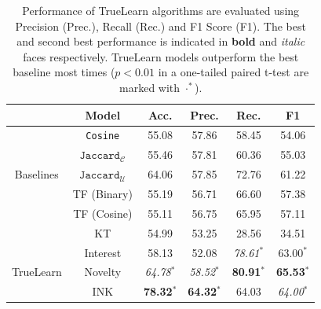 \documentclass[letterpaper]{article} %
\begin{document}
\begin{table}[] \small
\caption{Performance of TrueLearn algorithms are evaluated using Precision (Prec.), Recall (Rec.) and F1 Score (F1). The best and second best performance is indicated in \textbf{bold} and \emph{italic} faces respectively. TrueLearn models outperform the best baseline most times ($p< 0.01$ in a one-tailed paired t-test are marked with $\cdot^{*}$).}
\label{tab:results}
\begin{tabular}{cccccc}
\hline
& Model              & Acc. & Prec. & Rec. & F1    \\
\hline
&\texttt{Cosine}& {55.08} & {57.86} & 58.45 & 54.06 \\
&$\texttt{Jaccard}_{\mathcal{C}}$& 55.46 & 57.81 & 60.36 & 55.03 \\
Baselines&$\texttt{Jaccard}_{\mathcal{U}}$ & 64.06 & 57.85 & {72.76} & {61.22} \\
&TF (Binary)	& 55.19 &	56.71 & 66.60 &	57.38 \\
&TF (Cosine) & 55.11 &	56.75	& 65.95	 & 57.11 \\
&KT & 54.99 & 53.25 & 28.56 & 34.51 \\
\hline
&Interest & 58.13    & 52.08     & \textit{78.61}$^{*}$  & 63.00$^{*}$ \\
TrueLearn & Novelty  & \textit{64.78}$^{*}$	  & \textit{58.52}$^{*}$  & \textbf{80.91}$^{*}$  & \textbf{65.53}$^{*}$ \\
&INK  & \textbf{78.32}$^{*}$	  & \textbf{64.32}$^{*}$	  & {64.03}  & \textit{64.00}$^{*}$ \\
\hline
\end{tabular}
\end{table}



\end{document}
